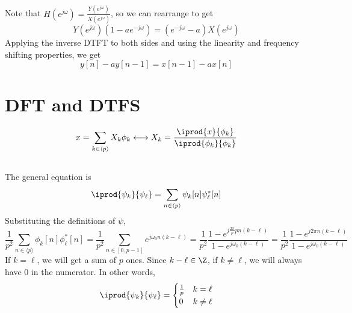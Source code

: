 \documentclass{article}
\begin{document}
\subsection{}

Note that \(H(e^{j \omega}) = \frac{Y(e^{j \omega})}{X(e^{j \omega})}\), so we can rearrange to get
\begin{equation}
    Y(e^{j \omega}) (1 - ae^{-j \omega}) = (e^{-j \omega} - a) X(e^{j \omega})
\end{equation}
Applying the inverse DTFT to both sides and using the linearity and frequency shifting properties, we get
\begin{equation}
    y[n] - ay[n - 1] = x[n - 1] - ax[n]
\end{equation}

\section{DFT and DTFS}

\begin{equation}
    x = \sum_{k \in \langle p \rangle} X_k \phi_k \longleftrightarrow X_k = \frac{\iprod{x}{\phi_k}}{\iprod{\phi_k}{\phi_k}}
\end{equation}

\subsection{}

The general equation is
\begin{equation}
    \iprod{\psi_k}{\psi_\ell} = \sum_{n \in \langle p \rangle} \psi_k[n] \psi_\ell^\ast[n]
\end{equation}
Substituting the definitions of \(\psi\),
\begin{equation}
    \frac{1}{p^2} \sum_{n \in \langle p \rangle} \phi_k[n] \phi_\ell^\ast[n] = \frac{1}{p^2} \sum_{n \in [0, p - 1]} e^{j \omega_0 n (k - \ell)} = \frac{1}{p^2} \frac{1 - e^{j \frac{2\pi}{p} p n (k - \ell)}}{1 - e^{j \omega_0 (k - \ell)}} = \frac{1}{p^2} \frac{1 - e^{j 2\pi n (k - \ell)}}{1 - e^{j \omega_0 (k - \ell)}}
\end{equation}
If \(k = \ell\), we will get a sum of \(p\) ones.
Since \(k - \ell \in \Z\), if \(k \neq \ell\), we will always have \(0\) in the numerator.
In other words,
\begin{equation}
    \iprod{\psi_k}{\psi_\ell} =
    \begin{cases}
        \frac{1}{p} & k = \ell \\
        0 & k \neq \ell
    \end{cases}
\end{equation}
\end{document}
